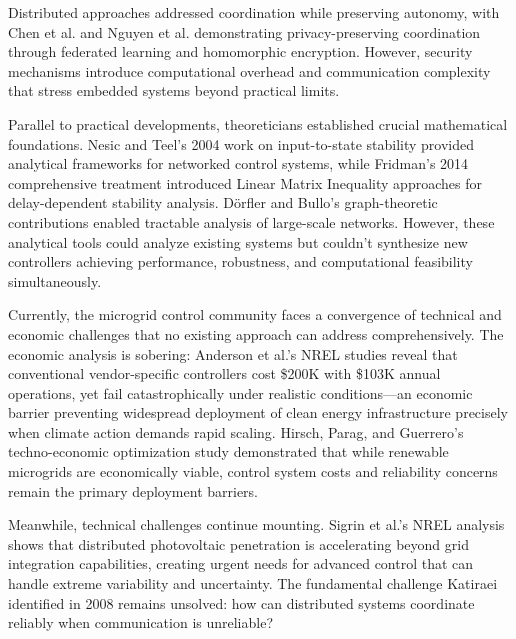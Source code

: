 \documentclass[12pt]{article}
\begin{document}
Distributed approaches addressed coordination while preserving autonomy, with Chen et al. \cite{chen2021} and Nguyen et al. \cite{nguyen2022} demonstrating privacy-preserving coordination through federated learning and homomorphic encryption. However, security mechanisms introduce computational overhead and communication complexity that stress embedded systems beyond practical limits.

Parallel to practical developments, theoreticians established crucial mathematical foundations. Nesic and Teel's 2004 work \cite{nesic2004} on input-to-state stability provided analytical frameworks for networked control systems, while Fridman's 2014 comprehensive treatment \cite{fridman2014} introduced Linear Matrix Inequality approaches for delay-dependent stability analysis. Dörfler and Bullo's graph-theoretic contributions \cite{dorfler2013} enabled tractable analysis of large-scale networks. However, these analytical tools could analyze existing systems but couldn't synthesize new controllers achieving performance, robustness, and computational feasibility simultaneously.

Currently, the microgrid control community faces a convergence of technical and economic challenges that no existing approach can address comprehensively. The economic analysis is sobering: Anderson et al.'s NREL studies \cite{anderson2021,anderson2019} reveal that conventional vendor-specific controllers cost \$200K with \$103K annual operations, yet fail catastrophically under realistic conditions---an economic barrier preventing widespread deployment of clean energy infrastructure precisely when climate action demands rapid scaling. Hirsch, Parag, and Guerrero's techno-economic optimization study \cite{hirsch2018} demonstrated that while renewable microgrids are economically viable, control system costs and reliability concerns remain the primary deployment barriers.

Meanwhile, technical challenges continue mounting. Sigrin et al.'s NREL analysis \cite{sigrin2019} shows that distributed photovoltaic penetration is accelerating beyond grid integration capabilities, creating urgent needs for advanced control that can handle extreme variability and uncertainty. The fundamental challenge Katiraei identified in 2008 remains unsolved: how can distributed systems coordinate reliably when communication is unreliable?
\end{document}
